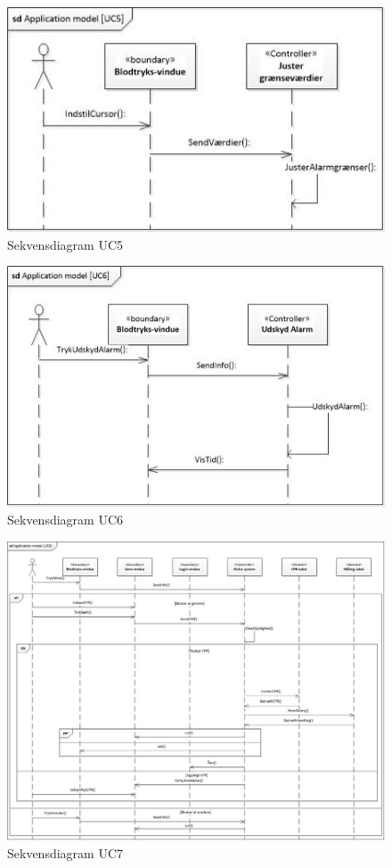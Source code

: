 \begin{figure}[H]
	\includegraphics[width=1\textwidth]{Figurer/sdAppModelUC5}
	\caption{Sekvensdiagram UC5}
	\label{sd UC5}
\end{figure}

\begin{figure}[H]
	\includegraphics[width=1\textwidth]{Figurer/sdAppModelUC6}
	\caption{Sekvensdiagram UC6}
	\label{sd UC6}
\end{figure}

\begin{figure}[H]
	\includegraphics[width=1\textwidth]{Figurer/sdAppModelUC7}
	\caption{Sekvensdiagram UC7}
	\label{sd UC7}
\end{figure}

